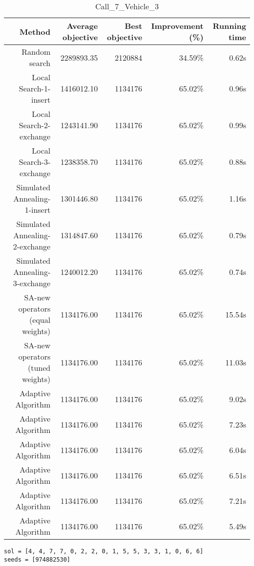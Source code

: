 \begin{table}[ht]
\centering
\caption{Call\_7\_Vehicle\_3}
\label{tab:call7vehicle3}
\begin{tabular}{|r|r|r|r|r|}
Method & Average objective & Best objective & Improvement (\%) & Running time \\
\hline
Random search & 2289893.35 & 2120884 & 34.59\% & 0.62s\\
Local Search-1-insert & 1416012.10 & 1134176 & 65.02\% & 0.96s\\
Local Search-2-exchange & 1243141.90 & 1134176 & 65.02\% & 0.99s\\
Local Search-3-exchange & 1238358.70 & 1134176 & 65.02\% & 0.88s\\
Simulated Annealing-1-insert & 1301446.80 & 1134176 & 65.02\% & 1.16s\\
Simulated Annealing-2-exchange & 1314847.60 & 1134176 & 65.02\% & 0.79s\\
Simulated Annealing-3-exchange & 1240012.20 & 1134176 & 65.02\% & 0.74s\\
SA-new operators (equal weights) & 1134176.00 & 1134176 & 65.02\% & 15.54s\\
SA-new operators (tuned weights) & 1134176.00 & 1134176 & 65.02\% & 11.03s\\
Adaptive Algorithm & 1134176.00 & 1134176 & 65.02\% & 9.02s\\
Adaptive Algorithm & 1134176.00 & 1134176 & 65.02\% & 7.23s\\
Adaptive Algorithm & 1134176.00 & 1134176 & 65.02\% & 6.04s\\
Adaptive Algorithm & 1134176.00 & 1134176 & 65.02\% & 6.51s\\
Adaptive Algorithm & 1134176.00 & 1134176 & 65.02\% & 7.21s\\
Adaptive Algorithm & 1134176.00 & 1134176 & 65.02\% & 5.49s\\
\end{tabular}%
\end{table}
\begin{lstlisting}[label={lst:call7vehicle3},caption=Optimal solution call\_7\_vehicle\_3]
sol = [4, 4, 7, 7, 0, 2, 2, 0, 1, 5, 5, 3, 3, 1, 0, 6, 6]
seeds = [974882530]
\end{lstlisting}%
\clearpage


